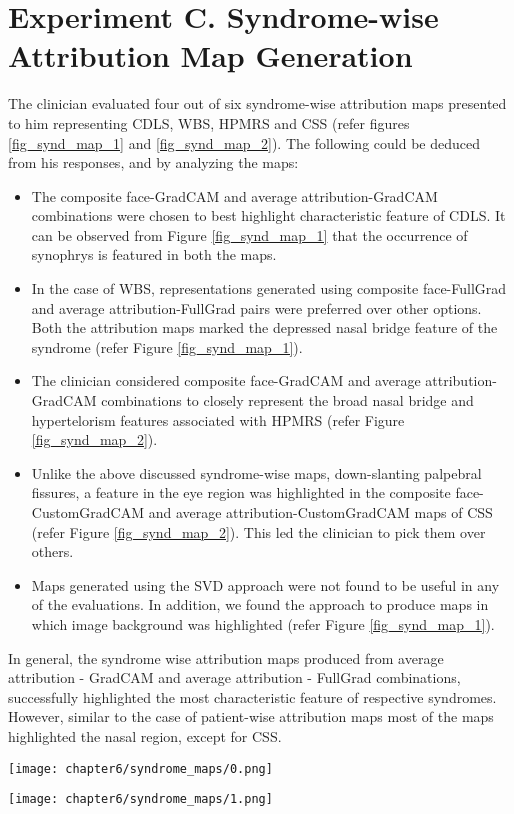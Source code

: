 \documentclass[../report.tex]{subfiles}
\begin{document}
  	\section{Experiment C. Syndrome-wise Attribution Map Generation} \label{sec_expc}
    The clinician evaluated four out of six syndrome-wise attribution maps presented to him representing CDLS, WBS, HPMRS and CSS (refer figures \ref{fig_synd_map_1} and \ref{fig_synd_map_2}). The following could be deduced from his responses, and by analyzing the maps:
    \begin{itemize}
    	\item The composite face-GradCAM and average attribution-GradCAM combinations were chosen to best highlight characteristic feature of CDLS. It can be observed from Figure \ref{fig_synd_map_1} that the occurrence of synophrys is featured in both the maps.
    	\item In the case of WBS, representations generated using composite face-FullGrad and average attribution-FullGrad pairs were preferred over other options. Both the attribution maps marked the depressed nasal bridge feature of the syndrome (refer Figure \ref{fig_synd_map_1}).
    	\item The clinician considered composite face-GradCAM and average attribution-GradCAM combinations to closely represent the broad nasal bridge and hypertelorism features associated with HPMRS (refer Figure \ref{fig_synd_map_2}).
    	\item Unlike the above discussed syndrome-wise maps, down-slanting palpebral fissures, a feature in the eye region was highlighted in the composite face-CustomGradCAM and average attribution-CustomGradCAM maps of CSS (refer Figure \ref{fig_synd_map_2}). This led the clinician to pick them over others.
    	\item Maps generated using the SVD approach were not found to be useful in any of the evaluations. In addition, we found the approach to produce maps in which image background was highlighted (refer Figure \ref{fig_synd_map_1}).
    \end{itemize}
	In general, the syndrome wise attribution maps produced from average attribution - GradCAM and average attribution - FullGrad combinations, successfully highlighted the most characteristic feature of respective syndromes. However, similar to the case of patient-wise attribution maps most of the maps highlighted the nasal region, except for CSS.  
    \pagebreak	
    
    \clearpage
        \begin{sidewaysfigure}
    	\texttt{[image: chapter6/syndrome\_maps/0.png]}
    	
    	\texttt{[image: chapter6/syndrome\_maps/1.png]}
    	
    	\caption[Syndrome-wise attribution maps of CDLS and WBS]{Syndrome-wise attribution maps of CDLS (top three rows) and WBS (bottom three rows). Options chosen by the clinician are boxed in black.}
    	\label{fig_synd_map_1}	
    	\end{sidewaysfigure}
    
\end{document}
